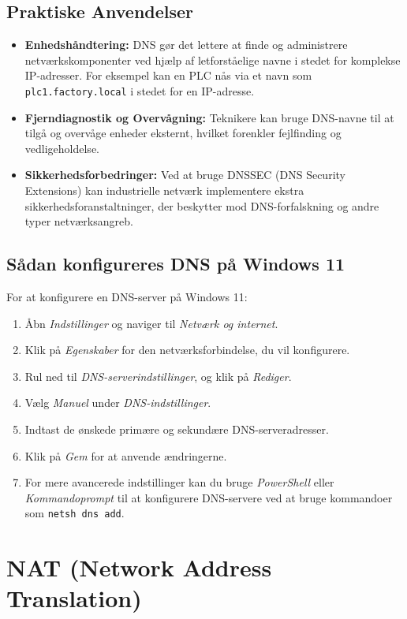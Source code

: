 \subsection{Praktiske Anvendelser}
\begin{itemize}
	\item \textbf{Enhedshåndtering:} DNS gør det lettere at finde og administrere netværkskomponenter ved hjælp af letforståelige navne i stedet for komplekse IP-adresser. For eksempel kan en PLC nås via et navn som \texttt{plc1.factory.local} i stedet for en IP-adresse.
	\item \textbf{Fjerndiagnostik og Overvågning:} Teknikere kan bruge DNS-navne til at tilgå og overvåge enheder eksternt, hvilket forenkler fejlfinding og vedligeholdelse.
	\item \textbf{Sikkerhedsforbedringer:} Ved at bruge DNSSEC (DNS Security Extensions) kan industrielle netværk implementere ekstra sikkerhedsforanstaltninger, der beskytter mod DNS-forfalskning og andre typer netværksangreb.
\end{itemize}

\subsection{Sådan konfigureres DNS på Windows 11}
For at konfigurere en DNS-server på Windows 11:
\begin{enumerate}
	\item Åbn \textit{Indstillinger} og naviger til \textit{Netværk og internet}.
	\item Klik på \textit{Egenskaber} for den netværksforbindelse, du vil konfigurere.
	\item Rul ned til \textit{DNS-serverindstillinger}, og klik på \textit{Rediger}.
	\item Vælg \textit{Manuel} under \textit{DNS-indstillinger}.
	\item Indtast de ønskede primære og sekundære DNS-serveradresser.
	\item Klik på \textit{Gem} for at anvende ændringerne.
	\item For mere avancerede indstillinger kan du bruge \textit{PowerShell} eller \textit{Kommandoprompt} til at konfigurere DNS-servere ved at bruge kommandoer som \texttt{netsh dns add}.
\end{enumerate}

\section{NAT (Network Address Translation)}
\label{subsec:nat}

